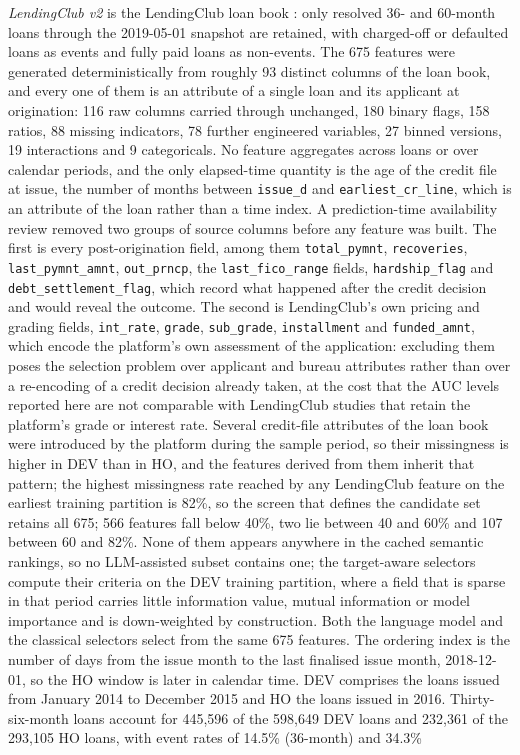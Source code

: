 \documentclass[final,5p,twocolumn]{elsarticle}
\begin{document}
\emph{LendingClub v2} is the LendingClub loan book \cite{lendingclub_kaggle}: only resolved 36- and 60-month loans through the 2019-05-01 snapshot are retained, with charged-off or defaulted loans as events and fully paid loans as non-events. The 675 features were generated deterministically from roughly 93 distinct columns of the loan book, and every one of them is an attribute of a single loan and its applicant at origination: 116 raw columns carried through unchanged, 180 binary flags, 158 ratios, 88 missing indicators, 78 further engineered variables, 27 binned versions, 19 interactions and 9 categoricals. No feature aggregates across loans or over calendar periods, and the only elapsed-time quantity is the age of the credit file at issue, the number of months between \texttt{issue\_\allowbreak d} and \texttt{earliest\_\allowbreak cr\_\allowbreak line}, which is an attribute of the loan rather than a time index. A prediction-time availability review removed two groups of source columns before any feature was built. The first is every post-origination field, among them \texttt{total\_\allowbreak pymnt}, \texttt{recoveries}, \texttt{last\_\allowbreak pymnt\_\allowbreak amnt}, \texttt{out\_\allowbreak prncp}, the \texttt{last\_\allowbreak fico\_\allowbreak range} fields, \texttt{hardship\_\allowbreak flag} and \texttt{debt\_\allowbreak settlement\_\allowbreak flag}, which record what happened after the credit decision and would reveal the outcome. The second is LendingClub's own pricing and grading fields, \texttt{int\_\allowbreak rate}, \texttt{grade}, \texttt{sub\_\allowbreak grade}, \texttt{installment} and \texttt{funded\_\allowbreak amnt}, which encode the platform's own assessment of the application: excluding them poses the selection problem over applicant and bureau attributes rather than over a re-encoding of a credit decision already taken, at the cost that the AUC levels reported here are not comparable with LendingClub studies that retain the platform's grade or interest rate. Several credit-file attributes of the loan book were introduced by the platform during the sample period, so their missingness is higher in DEV than in HO, and the features derived from them inherit that pattern; the highest missingness rate reached by any LendingClub feature on the earliest training partition is 82\%, so the screen that defines the candidate set retains all 675; 566 features fall below 40\%, two lie between 40 and 60\% and 107 between 60 and 82\%. None of them appears anywhere in the cached semantic rankings, so no LLM-assisted subset contains one; the target-aware selectors compute their criteria on the DEV training partition, where a field that is sparse in that period carries little information value, mutual information or model importance and is down-weighted by construction. Both the language model and the classical selectors select from the same 675 features. The ordering index is the number of days from the issue month to the last finalised issue month, 2018-12-01, so the HO window is later in calendar time. DEV comprises the loans issued from January 2014 to December 2015 and HO the loans issued in 2016. Thirty-six-month loans account for 445,596 of the 598,649 DEV loans and 232,361 of the 293,105 HO loans, with event rates of 14.5\% (36-month) and 34.3\% 
\end{document}

